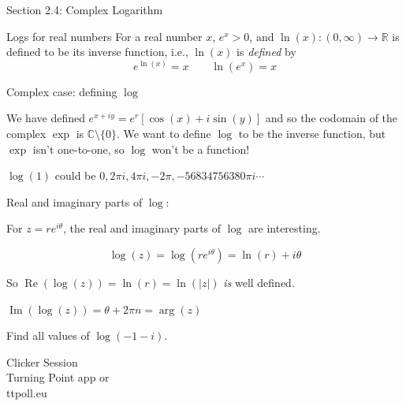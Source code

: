 \documentclass{beamer}
\newcommand{\C}{\mathbb{C}}
\newcommand{\R}{\mathbb{R}}
\DeclareMathOperator{\Real}{Re}
\DeclareMathOperator{\Imag}{Im}
\begin{document}
\begin{frame}{Section 2.4: Complex Logarithm}
\begin{block}{Logs for real numbers}
For a real number $x$, $e^x>0$, and $\ln(x):(0,\infty)\to\R$ is defined to be its inverse function, i.e., $\ln(x)$ is \emph{defined} by
$$e^{\ln(x)}=x \quad\quad \ln(e^x)=x$$
\end{block}
\begin{block}{Complex case: defining $\log$}

We have defined $e^{x+iy}=e^r\left[\cos(x)+i\sin(y)\right]$ and so the codomain of the complex $\exp$ is $\C\setminus\{0\}$.  We want to define $\log$ to be the inverse function, but $\exp$ isn't one-to-one, so $\log$ won't be a function!
    \end{block}
\begin{Example}
$\log(1)$ could be $0, 2\pi i, 4\pi i, -2\pi,-56834756380\pi i\cdots$
\end{Example}

\end{frame}
\begin{frame}{Real and imaginary parts of $\log$:}
    
For $z=re^{i\theta}$, the real and imaginary parts of $\log$ are interesting.  

 $$\log(z)=\log(re^{i\theta})=\ln(r)+i\theta$$

So $\Real(\log(z))=\ln(r)=\ln(|z|)$ \emph{is} well defined.

$\Imag(\log(z))=\theta+2\pi n=\arg(z)$
\begin{Example}
Find all values of $\log(-1-i)$.

\end{Example}

\end{frame}
\begin{frame}
  
\begin{center}

\Huge

Clicker Session \\
Turning Point app or \\
ttpoll.eu 

\end{center}

\end{frame}
\end{document}
